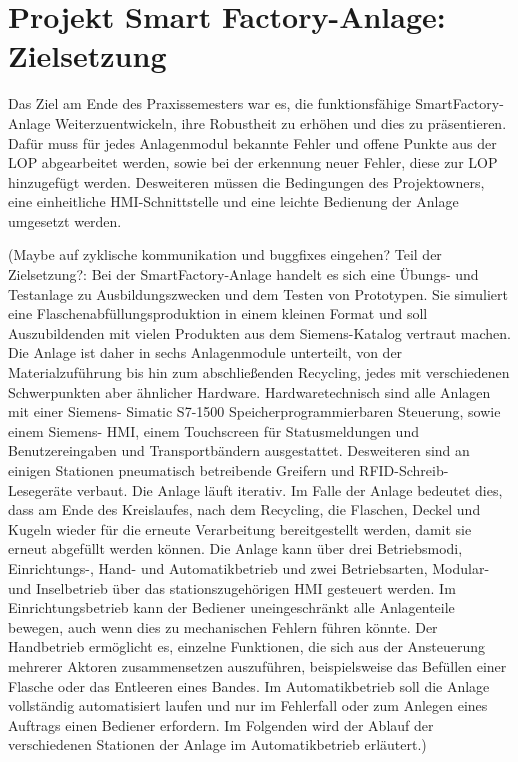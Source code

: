 \section{Projekt Smart Factory-Anlage: Zielsetzung}\label{sec:Projekt Smart Factory-Anlage: Zielsetzung}

Das Ziel am Ende des Praxissemesters war es, die funktionsfähige
SmartFactory-Anlage Weiterzuentwickeln, ihre Robustheit zu erhöhen und dies zu präsentieren. Dafür muss für jedes 
Anlagenmodul bekannte Fehler und offene Punkte aus der LOP abgearbeitet werden, sowie bei der erkennung neuer Fehler, 
diese zur LOP hinzugefügt werden. Desweiteren müssen die Bedingungen des Projektowners, eine einheitliche HMI-Schnittstelle 
und eine leichte Bedienung der Anlage umgesetzt werden.

(Maybe auf zyklische kommunikation und buggfixes eingehen? Teil der Zielsetzung?: Bei der SmartFactory-Anlage handelt es 
sich eine Übungs- und Testanlage zu Ausbildungszwecken und dem Testen von Prototypen. Sie simuliert eine 
Flaschenabfüllungsproduktion in einem kleinen Format und soll Auszubildenden mit vielen Produkten aus dem 
Siemens-Katalog vertraut machen.
Die Anlage ist daher in sechs Anlagenmodule unterteilt, von der Materialzuführung bis hin zum abschließenden 
Recycling, jedes mit verschiedenen Schwerpunkten aber ähnlicher Hardware. Hardwaretechnisch sind alle Anlagen mit einer 
Siemens-
Simatic S7-1500 Speicherprogrammierbaren Steuerung, sowie einem Siemens-
HMI, einem Touchscreen für Statusmeldungen und Benutzereingaben und Transportbändern ausgestattet. Desweiteren sind an 
einigen Stationen pneumatisch betreibende Greifern und RFID-Schreib-Lesegeräte verbaut. Die Anlage läuft iterativ. 
Im Falle der Anlage bedeutet dies, dass am Ende des Kreislaufes, nach dem Recycling, die Flaschen, Deckel und Kugeln 
wieder für die erneute Verarbeitung bereitgestellt werden, damit sie erneut abgefüllt werden können. Die Anlage kann 
über drei Betriebsmodi, Einrichtungs-, Hand- und Automatikbetrieb und zwei Betriebsarten, Modular- und Inselbetrieb 
über das stationszugehörigen HMI gesteuert werden. Im Einrichtungsbetrieb kann der Bediener uneingeschränkt alle 
Anlagenteile bewegen, auch wenn dies zu mechanischen Fehlern führen könnte. Der Handbetrieb ermöglicht es, einzelne 
Funktionen, die sich aus der Ansteuerung mehrerer Aktoren zusammensetzen auszuführen, beispielsweise das Befüllen einer 
Flasche oder das Entleeren eines Bandes. Im Automatikbetrieb soll die Anlage vollständig automatisiert laufen und nur im 
Fehlerfall oder zum Anlegen eines Auftrags einen Bediener erfordern. Im Folgenden wird der Ablauf der verschiedenen 
Stationen der Anlage im Automatikbetrieb erläutert.)

